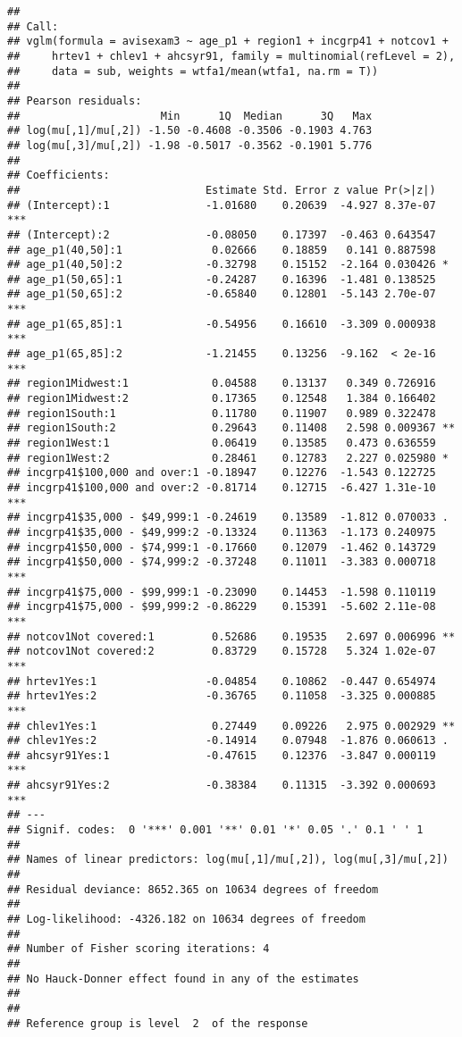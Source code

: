 \documentclass[]{article}
\begin{document}
\begin{verbatim}
## 
## Call:
## vglm(formula = avisexam3 ~ age_p1 + region1 + incgrp41 + notcov1 + 
##     hrtev1 + chlev1 + ahcsyr91, family = multinomial(refLevel = 2), 
##     data = sub, weights = wtfa1/mean(wtfa1, na.rm = T))
## 
## Pearson residuals:
##                      Min      1Q  Median      3Q   Max
## log(mu[,1]/mu[,2]) -1.50 -0.4608 -0.3506 -0.1903 4.763
## log(mu[,3]/mu[,2]) -1.98 -0.5017 -0.3562 -0.1901 5.776
## 
## Coefficients: 
##                             Estimate Std. Error z value Pr(>|z|)    
## (Intercept):1               -1.01680    0.20639  -4.927 8.37e-07 ***
## (Intercept):2               -0.08050    0.17397  -0.463 0.643547    
## age_p1(40,50]:1              0.02666    0.18859   0.141 0.887598    
## age_p1(40,50]:2             -0.32798    0.15152  -2.164 0.030426 *  
## age_p1(50,65]:1             -0.24287    0.16396  -1.481 0.138525    
## age_p1(50,65]:2             -0.65840    0.12801  -5.143 2.70e-07 ***
## age_p1(65,85]:1             -0.54956    0.16610  -3.309 0.000938 ***
## age_p1(65,85]:2             -1.21455    0.13256  -9.162  < 2e-16 ***
## region1Midwest:1             0.04588    0.13137   0.349 0.726916    
## region1Midwest:2             0.17365    0.12548   1.384 0.166402    
## region1South:1               0.11780    0.11907   0.989 0.322478    
## region1South:2               0.29643    0.11408   2.598 0.009367 ** 
## region1West:1                0.06419    0.13585   0.473 0.636559    
## region1West:2                0.28461    0.12783   2.227 0.025980 *  
## incgrp41$100,000 and over:1 -0.18947    0.12276  -1.543 0.122725    
## incgrp41$100,000 and over:2 -0.81714    0.12715  -6.427 1.31e-10 ***
## incgrp41$35,000 - $49,999:1 -0.24619    0.13589  -1.812 0.070033 .  
## incgrp41$35,000 - $49,999:2 -0.13324    0.11363  -1.173 0.240975    
## incgrp41$50,000 - $74,999:1 -0.17660    0.12079  -1.462 0.143729    
## incgrp41$50,000 - $74,999:2 -0.37248    0.11011  -3.383 0.000718 ***
## incgrp41$75,000 - $99,999:1 -0.23090    0.14453  -1.598 0.110119    
## incgrp41$75,000 - $99,999:2 -0.86229    0.15391  -5.602 2.11e-08 ***
## notcov1Not covered:1         0.52686    0.19535   2.697 0.006996 ** 
## notcov1Not covered:2         0.83729    0.15728   5.324 1.02e-07 ***
## hrtev1Yes:1                 -0.04854    0.10862  -0.447 0.654974    
## hrtev1Yes:2                 -0.36765    0.11058  -3.325 0.000885 ***
## chlev1Yes:1                  0.27449    0.09226   2.975 0.002929 ** 
## chlev1Yes:2                 -0.14914    0.07948  -1.876 0.060613 .  
## ahcsyr91Yes:1               -0.47615    0.12376  -3.847 0.000119 ***
## ahcsyr91Yes:2               -0.38384    0.11315  -3.392 0.000693 ***
## ---
## Signif. codes:  0 '***' 0.001 '**' 0.01 '*' 0.05 '.' 0.1 ' ' 1
## 
## Names of linear predictors: log(mu[,1]/mu[,2]), log(mu[,3]/mu[,2])
## 
## Residual deviance: 8652.365 on 10634 degrees of freedom
## 
## Log-likelihood: -4326.182 on 10634 degrees of freedom
## 
## Number of Fisher scoring iterations: 4 
## 
## No Hauck-Donner effect found in any of the estimates
## 
## 
## Reference group is level  2  of the response
\end{verbatim}
\end{document}
